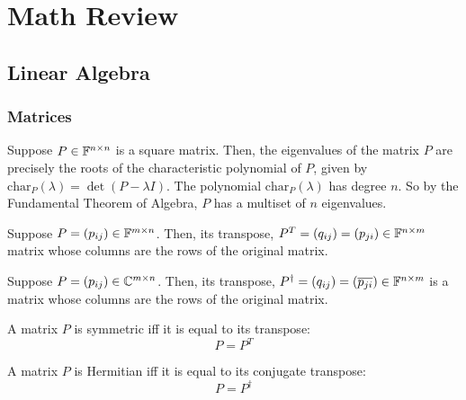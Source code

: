 \chapter{Math Review}

\section{Linear Algebra}
\subsection{Matrices}
\begin{definition}[Eigenvalue]
Suppose $P \in \mathbb{F}^{n \times n}$ is a square matrix. Then, the eigenvalues of the matrix $P$ are precisely the roots of the characteristic polynomial of $P$, given by $\text{char}_P(\lambda) = \det(P - \lambda I)$. The polynomial $\text{char}_P(\lambda)$ has degree $n$. So by the Fundamental Theorem of Algebra, $P$ has a multiset of $n$ eigenvalues.
\end{definition}


\begin{definition}[Transpose]
Suppose $P = (p_{ij}) \in \mathbb{F}^{m\times n}$. Then, its transpose, $P^{T} = (q_{ij}) = (p_{ji}) \in \mathbb{F}^{n\times m}$ matrix whose columns are the rows of the original matrix.
\end{definition}

\begin{definition}
Suppose $P = (p_{ij}) \in \mathbb{C}^{m\times n}$. Then, its transpose, $P^{\dagger} = (q_{ij}) = (\overline{p_{ji}}) \in \mathbb{F}^{n\times m}$ is a matrix whose columns are the rows of the original matrix.
\end{definition}

\begin{definition}
A matrix $P$ is symmetric iff it is equal to its transpose:
$$ P = P^{T}$$
\end{definition}

\begin{definition}
A matrix $P$ is Hermitian iff it is equal to its conjugate transpose:
$$ P = P^{\dagger}$$
\end{definition}

